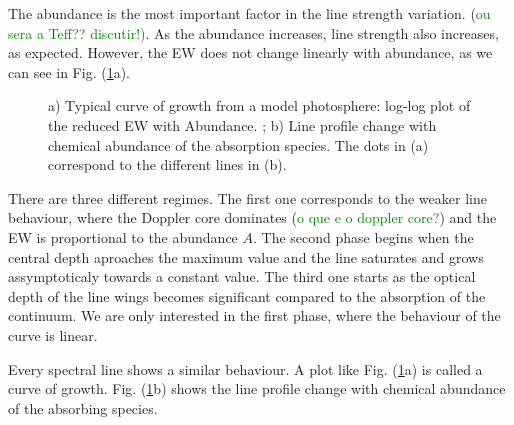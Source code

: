 \documentclass[dvips,12pt,a4paper]{report}
\begin{document}
{The abundance is the most important factor in the line strength variation. (\textcolor{green}{ou sera a Teff?? discutir!)}. As the abundance increases, line strength also increases, as expected. However, the EW does not change linearly with abundance, as we can see in Fig. (\ref{cog}a). 
\begin{figure}[h]
\centering
{}
\caption[EW and Profile dependence of abundance] {a) Typical curve of growth from a model photosphere: log-log plot of the reduced EW with Abundance. ; b) Line profile change with chemical abundance of the absorption species. The dots in (a) correspond to the different lines in (b).}
\label{cog}
\end{figure}

There are three different regimes. The first one corresponds to the weaker line behaviour, where the Doppler core dominates (\textcolor{green}{o que e o doppler core?}) and the EW is proportional to the abundance $A$. The second phase begins when the central depth aproaches the maximum value and the line saturates and grows assymptoticaly towards a constant value. The third one starts as the optical depth of the line wings becomes significant compared to the absorption of the continuum. We are only interested in the first phase, where the behaviour of the curve is linear.

Every spectral line shows a similar behaviour. A plot like Fig. (\ref{cog}a) is called a curve of growth. Fig. (\ref{cog}b) shows the line profile change with chemical abundance of the absorbing species. 

}
\end{document}
